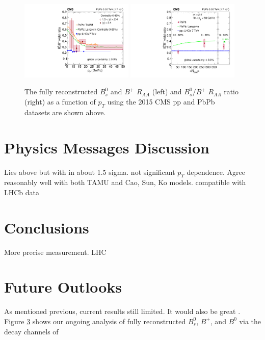 \begin{figure}[hbtp]
\begin{center}
\includegraphics[width=0.48\textwidth]{Figures/Chapter6/ratio_bsbu_vsPt.pdf}
\includegraphics[width=0.48\textwidth]{Figures/Chapter6/ratio_bsbu_vsCent.pdf}
\caption{The fully reconstructed $B^0_s$ and $B^+$ $R_{AA}$ (left) and $B^0_s/B^+$ $R_{AA}$ ratio (right) as a function of $p_T$ using the 2015 CMS pp and PbPb datasets are shown above.}
\label{FinalResults}
\end{center}
\end{figure}   
 

\section{Physics Messages Discussion}

Lies above but with in about 1.5 sigma. not significant $p_T$ dependence. Agree reasonably well with both TAMU and Cao, Sun, Ko models. compatible with LHCb data


\section{Conclusions}

More precise measurement. LHC

\section{Future Outlooks}

As mentioned previous, current results still limited. It would also be great . Figure \ref{} shows our ongoing analysis of fully reconstructed $B^0_s$, $B^+$, and $B^0$ via the decay channels of 


